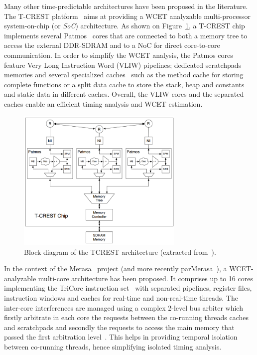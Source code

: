 \documentclass[main.tex]{subfiles}
\begin{document}
Many other time-predictable architectures have been proposed in the literature. The T-CREST platform~\cite{tcrest2015} aims at providing a WCET analyzable multi-processor system-on-chip (or \emph{SoC}) architecture. As shown on Figure~\ref{fig_stateOfTheArt_TCRESTarchi}, a T-CREST chip implements several Patmos~\cite{patmos2011} cores that are connected to both a memory tree to access the external DDR-SDRAM and to a NoC for direct core-to-core communication. In order to simplify the WCET analysis, the Patmos cores feature Very Long Instruction Word (VLIW) pipelines; dedicated scratchpads memories and several specialized caches~\cite{Schoeberl2009} such as the method cache for storing complete functions or a split data cache to store the stack, heap and constants and static data in different caches. Overall, the VLIW cores and the separated caches enable an efficient timing analysis and WCET estimation.\\

\begin{figure}
    \centering
    \includegraphics[width=8cm]{imgs/png/stateOfTheArt_TCRESTarchi.png}
    \caption{Block diagram of the TCREST architecture (extracted from~\cite{tcrest2015}).}
    \label{fig_stateOfTheArt_TCRESTarchi}
\end{figure}


In the context of the Merasa~\cite{Merasa} project (and more recently parMerasa~\cite{parMerasa}), a WCET-analyzable multi-core architecture has been proposed. It comprises up to 16 cores implementing the TriCore instruction set~\cite{TriCore} with separated pipelines, register files, instruction windows and caches for real-time and non-real-time threads. The inter-core interferences are managed using a complex 2-level bus arbiter which firstly arbitrate in each core the requests between the co-running threads caches and scratchpads and secondly the requests to access the main memory that passed the first arbitration level~\cite{Paolieri2009_SIGARCH}. This helps in providing temporal isolation between co-running threads, hence simplifying isolated timing analysis. \\
\end{document}
